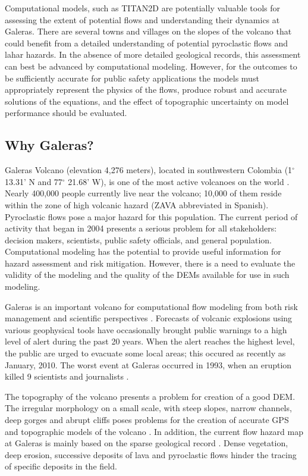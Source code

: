 \documentclass[a4paper,fleqn]{article}
\newcommand{\Deg}{$^{\circ}$}
\begin{document}
Computational models, such as TITAN2D are potentially valuable tools
for assessing the extent of potential flows and understanding their
dynamics at Galeras. There are several towns and villages on the
slopes of the volcano that could benefit from a detailed understanding
of potential pyroclastic flows and lahar hazards. In the absence of more detailed geological
records, this assessment can best be advanced by computational
modeling. However, for the outcomes to be sufficiently accurate for
public safety applications the models must appropriately represent the
physics of the flows, produce robust and accurate solutions of the
equations, and the effect of topographic uncertainty on model
performance should be evaluated.

\subsection{Why Galeras?}

Galeras Volcano (elevation 4,276 meters), located in southwestern Colombia (1\Deg 13.31' N and 77\Deg
21.68' W), is one of the most active volcanoes on the world
\citep{hurtado_1997}. Nearly 400,000 people currently live near the
volcano; 10,000 of them reside within the zone of high volcanic hazard
(ZAVA abbreviated in Spanish). Pyroclastic flows pose a major hazard
for this population. The current period of activity that began in 2004
presents a serious problem for all stakeholders: decision makers,
scientists, public safety officials, and general population.
Computational modeling has the potential to provide useful information
for hazard assessment and risk mitigation.  However, there is a need
to evaluate the validity of the modeling and the quality of the DEMs
available for use in such modeling.
 

Galeras  is an important volcano for
computational flow modeling from both risk management and scientific
perspectives \citep{calvache1997}. Forecasts of volcanic explosions
using various geophysical tools \citep{narvaez_1997} have occasionally
brought public warnings to a high level of alert during the past 20
years. When the alert reaches the highest level, the public are urged to evacuate some
local areas; this occured  as recently as January, 2010. The worst event at Galeras
occurred in 1993, when an eruption killed 9 scientists and journalists
\citep{baxter1997}.


The topography of the volcano presents a problem for creation of a
good DEM. The irregular morphology on a small scale, with steep slopes,
narrow channels, deep gorges and abrupt cliffs poses problems for the
creation of accurate GPS and topographic models of the volcano
\citep{ordones_2000}. In addition, the current flow hazard map at
Galeras is mainly based on the sparse geological record
\citep{calvache_1990a}. Dense vegetation, deep erosion, successive
deposits of lava and pyroclastic flows hinder the tracing of specific
deposits in the field.
\end{document}
